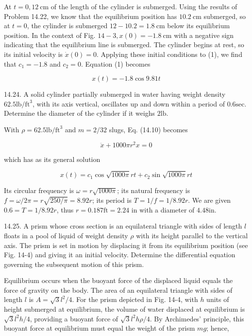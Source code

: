 \documentclass[10pt]{article}
\begin{document}
At $t=0,12 \mathrm{~cm}$ of the length of the cylinder is submerged. Using the results of Problem 14.22, we know that the equilibrium position has $10.2 \mathrm{~cm}$ submerged, so at $t=0$, the cylinder is submerged $12-10.2=1.8 \mathrm{~cm}$ below its equilibrium position. In the context of Fig. $14-3, x(0)=-1.8 \mathrm{~cm}$ with a negative sign indicating that the equilibrium line is submerged. The cylinder begins at rest, so its initial velocity is $\dot{x}(0)=0$. Applying these initial conditions to (1), we find that $c_{1}=-1.8$ and $c_{2}=0$. Equation (1) becomes

$$
x(t)=-1.8 \cos 9.81 t
$$

14.24. A solid cylinder partially submerged in water having weight density $62.5 \mathrm{lb} / \mathrm{ft}^{3}$, with its axis vertical, oscillates up and down within a period of $0.6 \mathrm{sec}$. Determine the diameter of the cylinder if it weighs $2 \mathrm{lb}$.

With $\rho=62.5 \mathrm{lb} / \mathrm{ft}^{3}$ and $m=2 / 32$ slugs, Eq. (14.10) becomes

$$
\ddot{x}+1000 \pi r^{2} x=0
$$

which has as its general solution


\begin{equation*}
x(t)=c_{1} \cos \sqrt{1000 \pi} r t+c_{2} \sin \sqrt{1000 \pi} r t \tag{1}
\end{equation*}


Its circular frequency is $\omega=r \sqrt{1000 \pi}$; its natural frequency is $f=\omega / 2 \pi=r \sqrt{250 / \pi}=8.92 r$; its period is $T=1 / f=1 / 8.92 r$. We are given $0.6=T=1 / 8.92 r$, thus $r=0.187 \mathrm{ft}=2.24$ in with a diameter of $4.48 \mathrm{in}$.

14.25. A prism whose cross section is an equilateral triangle with sides of length $l$ floats in a pool of liquid of weight density $\rho$ with its height parallel to the vertical axis. The prism is set in motion by displacing it from its equilibrium position (see Fig. 14-4) and giving it an initial velocity. Determine the differential equation governing the subsequent motion of this prism.

Equilibrium occurs when the buoyant force of the displaced liquid equals the force of gravity on the body. The area of an equilateral triangle with sides of length $l$ is $A=\sqrt{3} l^{2} / 4$. For the prism depicted in Fig. 14-4, with $h$ units of height submerged at equilibrium, the volume of water displaced at equilibrium is $\sqrt{3} l^{2} h / 4$, providing a buoyant force of $\sqrt{3} l^{2} h \rho / 4$. By Archimedes' principle, this buoyant force at equilibrium must equal the weight of the prism $m g$; hence,
\end{document}
